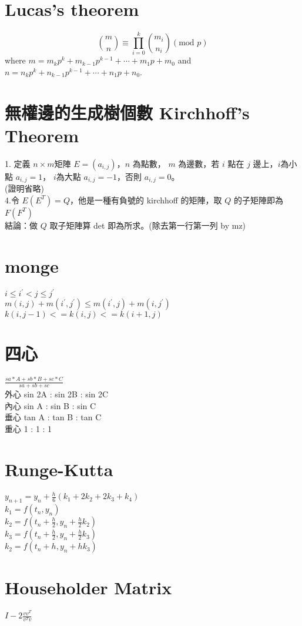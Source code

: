 \section{Lucas's theorem}
\[{m\choose n}\equiv\prod_{i=0}^k{m_i \choose n_i}(\mbox{mod }p)\] where $m=m_kp^k+m_{k-1}p^{k-1}+\cdots+m_1p+m_0$ and 
$n=n_kp^k+n_{k-1}p^{k-1}+\cdots+n_1p+n_0$.

\section{無權邊的生成樹個數 Kirchhoff's Theorem}
1. 定義 $n\times m$矩陣 $E=(a_{i,j})$，$n$ 為點數， $m$ 為邊數，若 $i$ 點在 $j$ 邊上，$i$為小點 $a_{i,j}=1$， $i$為大點 $a_{i,j}=-1$，否則 $a_{i,j}=0$。\\
(證明省略)
\\
4.令 $E(E^T)=Q$，他是一種有負號的 kirchhoff 的矩陣，取 $Q$ 的子矩陣即為 $F(F^T)$\\
結論：做 $Q$ 取子矩陣算 det 即為所求。(除去第一行第一列 by mz)

\section{monge}
$i \leq i^{'} < j \leq j^{'}$ \\
$m(i,j)+m(i^{'},j^{'}) \leq m(i^{'},j)+m(i,j^{'})$ \\
$k(i,j-1)<=k(i,j)<=k(i+1,j)$

\section{四心}
$\frac{sa*A+sb*B+sc*C}{sa+sb+sc}$ \\
外心 sin 2A : sin 2B : sin 2C \\
內心 sin  A : sin  B : sin  C \\
垂心 tan  A : tan  B : tan  C \\
重心      1 :      1 :      1 

\section{Runge-Kutta}
$y_{n+1}=y_n+\frac{h}{6}(k_1+2k_2+2k_3+k_4)$\\
$k_1=f(t_n,y_n)$\\
$k_2=f(t_n+\frac{h}{2},y_n+\frac{h}{2}k_2)$\\
$k_3=f(t_n+\frac{h}{2},y_n+\frac{h}{2}k_3)$\\
$k_2=f(t_n+h,y_n+hk_3)$

\section{Householder Matrix}
$I-2\frac{vv^T}{v^Tv}$